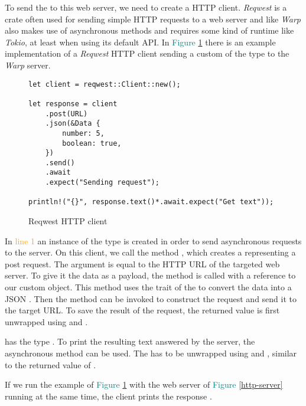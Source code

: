 To send the  to this web server, we need to create a HTTP client. \textit{Reqwest} is a crate often used
for sending simple HTTP requests to a web server and like \textit{Warp} also makes use of asynchronous methods and
requires some kind of runtime like \textit{Tokio}, at least when using its default API. In
\textcolor{teal}{Figure \ref{http-client}} there is an example implementation of a \textit{Reqwest} HTTP client sending
a custom  of the type  to the \textit{Warp} server.

\begin{figure}[ht]
    \begin{verbatim}
let client = reqwest::Client::new();

let response = client
    .post(URL)
    .json(&Data {
        number: 5,
        boolean: true,
    })
    .send()
    .await
    .expect("Sending request");

println!("{}", response.text()*.await.expect("Get text"));
    \end{verbatim}
    \caption{Reqwest HTTP client}
    \label{http-client}
\end{figure}

In \textcolor{orange}{line 1} an instance of the type  is created in order to send asynchronous
requests to the server. On this client, we call the method , which creates a 
representing a post request. The argument  is equal to the HTTP URL of the targeted web server. To give it
the data as a payload, the method  is called with a reference to our custom  object. This method
uses the  trait of the  to convert the data into a JSON . Then the
 method can be invoked to construct the request and send it to the target URL. To save the result of the
request, the returned value is first unwrapped using  and .

 has the type . To print the resulting text answered by the server, the
asynchronous method  can be used. The  has to be unwrapped using  and
, similar to the returned value of .

If we run the example of \textcolor{teal}{Figure \ref{http-client}} with the web server of
\textcolor{teal}{Figure \ref{http-server}} running at the same time, the client prints the response
 .
